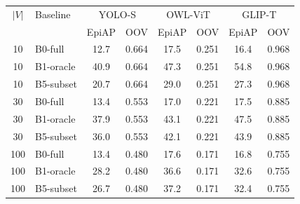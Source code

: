 \begin{tabular}{c l cc cc cc}
\toprule
$|V|$ & Baseline & \multicolumn{2}{c}{YOLO-S} & \multicolumn{2}{c}{OWL-ViT} & \multicolumn{2}{c}{GLIP-T} \\
 &  & EpiAP & OOV & EpiAP & OOV & EpiAP & OOV \\
\midrule
10 & B0-full & 12.7 & 0.664 & 17.5 & 0.251 & 16.4 & 0.968 \\
10 & B1-oracle & 40.9 & 0.664 & 47.3 & 0.251 & 54.8 & 0.968 \\
10 & B5-subset & 20.7 & 0.664 & 29.0 & 0.251 & 27.3 & 0.968 \\
30 & B0-full & 13.4 & 0.553 & 17.0 & 0.221 & 17.5 & 0.885 \\
30 & B1-oracle & 37.9 & 0.553 & 43.1 & 0.221 & 47.5 & 0.885 \\
30 & B5-subset & 36.0 & 0.553 & 42.1 & 0.221 & 43.9 & 0.885 \\
100 & B0-full & 13.4 & 0.480 & 17.6 & 0.171 & 16.8 & 0.755 \\
100 & B1-oracle & 28.2 & 0.480 & 36.6 & 0.171 & 32.6 & 0.755 \\
100 & B5-subset & 26.7 & 0.480 & 37.2 & 0.171 & 32.4 & 0.755 \\
\bottomrule
\end{tabular}
